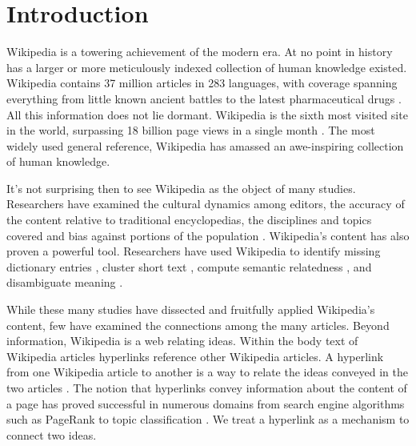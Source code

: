 \documentclass[pre,twocolumn,twoside,superscriptaddress,floatfix, aps, 10pt]{revtex4-1}
\begin{document}
\maketitle

\section{Introduction}



Wikipedia is a towering achievement of the modern era. 
At no point in history has a larger or more meticulously indexed collection of human knowledge 
existed.
Wikipedia contains 37 million articles in 283 languages, 
with coverage spanning everything from little known ancient battles to the latest pharmaceutical drugs 
\cite{stats} \cite{drugs}.
All this information does not lie dormant. 
Wikipedia is the sixth most visited
site in the world, surpassing 18 billion page views in a single month
\cite{wiki_views}.
The most widely used general reference, Wikipedia has amassed an awe-inspiring collection of human knowledge.

It's not surprising then to see Wikipedia as the object of many studies. 
Researchers have examined the cultural dynamics among editors,
\cite{editors}
the accuracy of the content relative to traditional encyclopedias,
\cite{accuracy1}
\cite{accuracy2}
the disciplines and topics covered 
\cite{coverage}
and bias against portions of the population
\cite{bias_women}.
Wikipedia's content has also proven a powerful tool. 
Researchers have used Wikipedia to identify missing dictionary entries
\cite{missing_entries},
cluster short text
\cite{clustering},
compute semantic relatedness
\cite{semantic_relatedness},
and disambiguate meaning \cite{disambiguating}.

While these many studies have dissected and fruitfully applied Wikipedia's content,
few have examined the connections among the many articles.
Beyond information, Wikipedia is a web 
relating ideas. 
Within the body text of Wikipedia articles hyperlinks reference
other Wikipedia articles.
A hyperlink from one Wikipedia article to another is a way to relate the ideas
conveyed in the two articles 
\cite{relevance}.
The notion that hyperlinks convey information about the content of a
page has proved successful in numerous domains from search engine algorithms 
such as PageRank 
\cite{pagerank} 
to topic classification
\cite{classifier}.
We treat a hyperlink as a mechanism to connect two ideas. 
\end{document}
